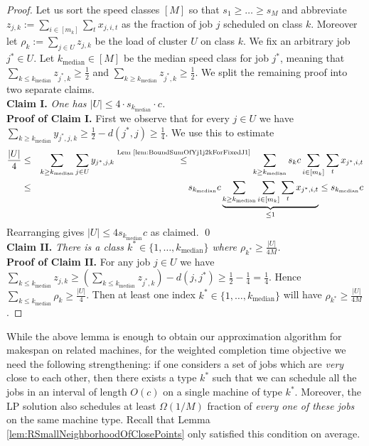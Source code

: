   \begin{proof} 
  Let us sort the speed classes $[M]$ so that $s_1 \geq \ldots \geq s_M$ and abbreviate $z_{j,k} := \sum_{i \in [m_k]} \sum_t x_{j,i,t}$ as the fraction of job $j$ scheduled on class $k$.
  Moreover  let $\rho_{k} := \sum_{j \in U} z_{j,k}$ be the load of cluster $U$ on class $k$.
  We fix an arbitrary job $j^* \in U$. Let $k_{\textrm{median}} \in [M]$ be the median speed class for job $j^*$, meaning that $\sum_{k \leq k_{\textrm{median}}} z_{j^*,k} \geq \frac{1}{2}$ and $\sum_{k \geq k_{\textrm{median}}} z_{j^*,k} \geq \frac{1}{2}$. 
  We split the remaining proof into two separate claims. \\
  {\bf Claim I.} \emph{One has $|U| \leq  4 \cdot s_{k_{\textrm{median}}} \cdot c$.} \\
  {\bf Proof of Claim I.} First we observe that for every $j \in U$ we have $\sum_{k \geq k_{\textrm{median}}} y_{j^*,j,k} \geq \frac{1}{2}-d(j^*,j) \geq \frac{1}{4}$. 
  We use this to estimate
  \begin{eqnarray*}
  \frac{|U|}{4} &\leq&  \sum_{k \geq k_{\textrm{median}}}\sum_{j \in U} y_{j^*,j,k} \stackrel{\textrm{Lem~\ref{lem:BoundSumOfYj1j2kForFixedJ1}}}{\leq}
  \sum_{k \geq k_{\textrm{median}}} s_k c\sum_{i \in [m_k]}\sum_{t}
  x_{j^*,i,t} \\ &\leq& s_{k_{\textrm{median}}}c \underbrace{\sum_{k \geq
  k_{\textrm{median}}} \sum_{i \in [m_k]}\sum_t x_{j^*,i,t}}_{\leq 1} 
  \leq s_{k_{\textrm{median}}}c
  \end{eqnarray*}
  Rearranging gives $|U| \leq 4s_{k_{\textrm{median}}}c$ as claimed. \qed \\
  {\bf Claim II.} \emph{There is a class $k^* \in \{1,\ldots,k_{\textrm{median}}\}$ where $\rho_{k^*} \geq \frac{|U|}{4M}$.} \\
  {\bf Proof of Claim II.} For any job $j \in U$ we have $\sum_{k \leq k_{\textrm{median}}} z_{j,k} \geq (\sum_{k \leq k_{\textrm{median}}} z_{j^*,k}) - d(j,j^*) \geq \frac{1}{2} - \frac{1}{4} = \frac{1}{4}$.
  Hence $\sum_{k \leq k_{\textrm{median}}} \rho_k \geq \frac{|U|}{4}$.
  Then at least one index $k^* \in \{ 1,\ldots,k_{\textrm{median}}\}$ will have $\rho_{k^*} \geq \frac{|U|}{4M}$.
  \end{proof}
  
  While the above lemma is enough to obtain our approximation algorithm for  makespan on related machines, for the weighted completion time objective we need the following strengthening: if one considers a set of jobs which are {\em very} close to each other, then there exists a type $k^*$ such that we can schedule all the jobs in an interval of length $O(c)$ on a single machine of type $k^*$. 
  Moreover, the LP solution also schedules at least $\Omega(1/M)$ fraction of {\em every one of these jobs} on the same machine type.
  Recall that Lemma \ref{lem:RSmallNeighborhoodOfClosePoints} only satisfied this condition on average.
  
